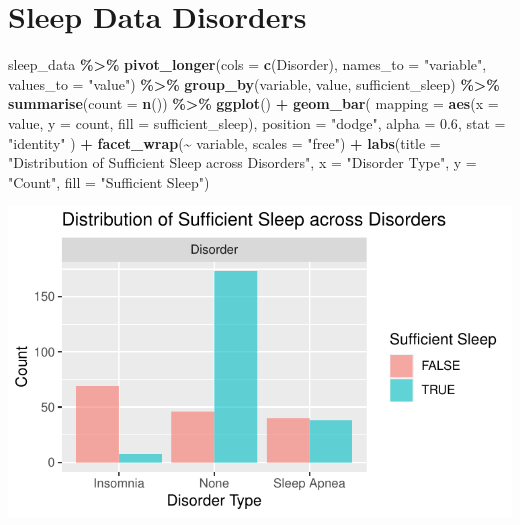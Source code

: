 \documentclass[
  11pt,
]{article}
\newenvironment{Shaded}{\begin{snugshade}}{\end{snugshade}}
\newcommand{\AttributeTok}[1]{\textcolor[rgb]{0.13,0.29,0.53}{#1}}
\newcommand{\FloatTok}[1]{\textcolor[rgb]{0.00,0.00,0.81}{#1}}
\newcommand{\FunctionTok}[1]{\textcolor[rgb]{0.13,0.29,0.53}{\textbf{#1}}}
\newcommand{\NormalTok}[1]{#1}
\newcommand{\SpecialCharTok}[1]{\textcolor[rgb]{0.81,0.36,0.00}{\textbf{#1}}}
\newcommand{\StringTok}[1]{\textcolor[rgb]{0.31,0.60,0.02}{#1}}
\begin{document}
\hypertarget{sleep-data-disorders}{%
\section{Sleep Data Disorders}\label{sleep-data-disorders}}

\begin{Shaded}
\begin{Highlighting}[]
\NormalTok{sleep\_data }\SpecialCharTok{\%\textgreater{}\%}
  \FunctionTok{pivot\_longer}\NormalTok{(}\AttributeTok{cols =} \FunctionTok{c}\NormalTok{(Disorder), }\AttributeTok{names\_to =} \StringTok{"variable"}\NormalTok{, }\AttributeTok{values\_to =} \StringTok{"value"}\NormalTok{) }\SpecialCharTok{\%\textgreater{}\%}
  \FunctionTok{group\_by}\NormalTok{(variable, value, sufficient\_sleep) }\SpecialCharTok{\%\textgreater{}\%}
  \FunctionTok{summarise}\NormalTok{(}\AttributeTok{count =} \FunctionTok{n}\NormalTok{()) }\SpecialCharTok{\%\textgreater{}\%}
  \FunctionTok{ggplot}\NormalTok{() }\SpecialCharTok{+}
  \FunctionTok{geom\_bar}\NormalTok{(}
    \AttributeTok{mapping =} \FunctionTok{aes}\NormalTok{(}\AttributeTok{x =}\NormalTok{ value, }\AttributeTok{y =}\NormalTok{ count, }\AttributeTok{fill =}\NormalTok{ sufficient\_sleep),}
    \AttributeTok{position =} \StringTok{"dodge"}\NormalTok{,   }
    \AttributeTok{alpha =} \FloatTok{0.6}\NormalTok{,}
    \AttributeTok{stat =} \StringTok{"identity"}
\NormalTok{  ) }\SpecialCharTok{+}
  \FunctionTok{facet\_wrap}\NormalTok{(}\SpecialCharTok{\textasciitilde{}}\NormalTok{ variable, }\AttributeTok{scales =} \StringTok{"free"}\NormalTok{) }\SpecialCharTok{+}
  \FunctionTok{labs}\NormalTok{(}\AttributeTok{title =} \StringTok{"Distribution of Sufficient Sleep across Disorders"}\NormalTok{,}
       \AttributeTok{x =} \StringTok{"Disorder Type"}\NormalTok{, }
       \AttributeTok{y =} \StringTok{"Count"}\NormalTok{, }
       \AttributeTok{fill =} \StringTok{"Sufficient Sleep"}\NormalTok{)}
\end{Highlighting}
\end{Shaded}

\begin{center}\includegraphics[width=0.7\linewidth]{SleepHelath_files/figure-latex/unnamed-chunk-35-1} \end{center}
\end{document}
